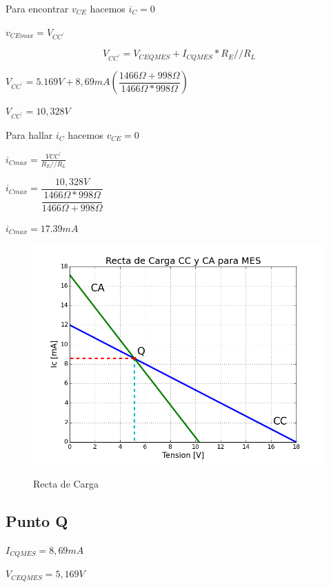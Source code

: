 \documentclass[12pt]{article}
\begin{document}
Para encontrar $v_{CE}$ hacemos $i_C=0$
\begin{center}
  $v_{CE max}=V_{CC^{'}}$
\end{center}

\begin{equation}
  V_{CC^{'}}=V_{CEQMES}+I_{CQMES}*R_E//R_L
\end{equation}
\begin{center}
 $V_{CC^{'}}=5.169V+8,69mA(\dfrac{1466\Omega+998\Omega}{1466\Omega*998\Omega})$
\vspace{0.2cm} 

$V_{CC^{'}}=10,328V$

\end{center}
  
Para hallar $i_{C}$ hacemos $v_{CE}=0$
\begin{center}
  $i_{C max}=\frac{V{CC^{'}}}{R_E//R_L}$
  
  $i_{C max}=\dfrac{10,328V}{\dfrac{1466\Omega*998\Omega}{1466\Omega+998\Omega}}$
\vspace{0.2cm} 

 $i_{C max}=17.39mA$
\end{center}

  
 \begin{figure}[ht]
\centering 
\includegraphics[scale = 0.6]{RectaCCCA.png}\\[0.25 cm]	%
\caption{Recta de Carga}
\label{Figura 5}
\end{figure}

\begin{center}

\subsection{Punto Q}
    
  $I_{CQMES}=8,69mA$

  $V_{CEQMES}=5,169V$
\end{center}
\end{document}

